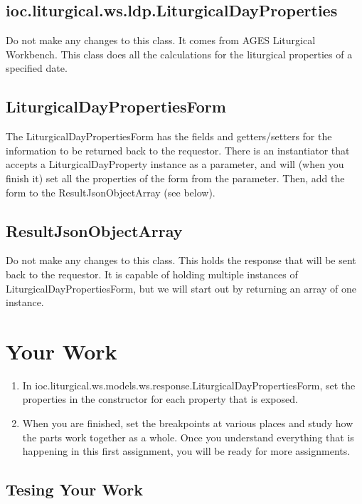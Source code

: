 \documentclass[]{memoir}
\begin{document}
\subsection{ioc.liturgical.ws.ldp.LiturgicalDayProperties}

Do not make any changes to this class.  It comes from AGES Liturgical Workbench.  This class does all the calculations for the liturgical properties of a specified date.

\subsection{LiturgicalDayPropertiesForm}

The LiturgicalDayPropertiesForm has the fields and getters/setters for the information to be returned back to the requestor.  There is an instantiator that accepts a LiturgicalDayProperty instance as a parameter, and will (when you finish it) set all the properties of the form from the parameter. Then, add the form to the ResultJsonObjectArray (see below).

\subsection{ResultJsonObjectArray}

Do not make any changes to this class.  This holds the response that will be sent back to the requestor.  It is capable of holding multiple instances of LiturgicalDayPropertiesForm, but we will start out by returning an array of one instance.

\section{Your Work}

\begin{enumerate}
    \item{In ioc.liturgical.ws.models.ws.response.LiturgicalDayPropertiesForm, set the properties in the constructor for each property that is exposed.}
    \item{When you are finished, set the breakpoints at various places and study how the parts work together as a whole.  Once you understand everything that is happening in this first assignment, you will be ready for more assignments.}
\end{enumerate}

\subsection{Tesing Your Work}
\end{document}
